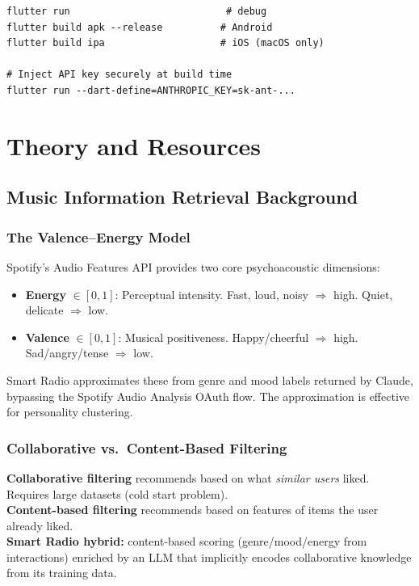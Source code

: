 \documentclass[12pt, a4paper]{report}
\begin{document}
\begin{tcolorbox}[cyanbox, title=Step 3 --- Run and Build]
\begin{lstlisting}[style=bashcode, numbers=none]
flutter run                           # debug
flutter build apk --release          # Android
flutter build ipa                    # iOS (macOS only)

# Inject API key securely at build time
flutter run --dart-define=ANTHROPIC_KEY=sk-ant-...
\end{lstlisting}
\end{tcolorbox}

\chapter{Theory and Resources}

\section{Music Information Retrieval Background}

\subsection{The Valence--Energy Model}
Spotify's Audio Features API provides two core psychoacoustic dimensions:
\begin{itemize}[noitemsep]
  \item \textbf{Energy} $\in [0,1]$: Perceptual intensity. Fast, loud,
        noisy $\Rightarrow$ high. Quiet, delicate $\Rightarrow$ low.
  \item \textbf{Valence} $\in [0,1]$: Musical positiveness. Happy/cheerful
        $\Rightarrow$ high. Sad/angry/tense $\Rightarrow$ low.
\end{itemize}

Smart Radio approximates these from genre and mood labels returned by Claude,
bypassing the Spotify Audio Analysis OAuth flow. The approximation
is effective for personality clustering.

\subsection{Collaborative vs.\ Content-Based Filtering}

\begin{tcolorbox}[theorybox]
\textbf{\color{violetcolor}Collaborative filtering} recommends based on what
\textit{similar users} liked. Requires large datasets (cold start problem).\\[4pt]
\textbf{\color{violetcolor}Content-based filtering} recommends based on
features of items the user already liked.\\[4pt]
\textbf{\color{violetcolor}Smart Radio hybrid:} content-based scoring
(genre/mood/energy from interactions) enriched by an LLM that implicitly
encodes collaborative knowledge from its training data.
\end{tcolorbox}
\end{document}
